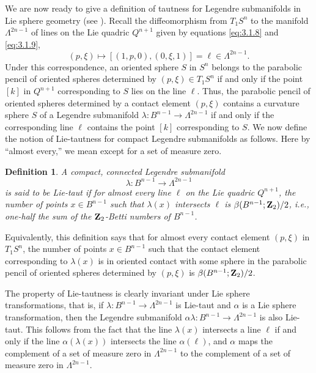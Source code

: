 \documentclass[12pt]{article}
\newtheorem{definition}{Definition}[section]
\begin{document}
We are now ready to give a definition of tautness for Legendre submanifolds in Lie sphere geometry
(see  \cite[pp. 89--92]{Cec1}).  Recall the
diffeomorphism from $T_1S^n$ to the manifold $\Lambda^{2n-1}$ of lines
on the Lie 
quadric $Q^{n+1}$ given by
equations \eqref{eq:3.1.8} and \eqref{eq:3.1.9},
\begin{equation}
\label{eq:3.6.49}
(p,\xi) \mapsto [(1,p,0),(0,\xi,1)] = \ell \in \Lambda^{2n-1}.
\end{equation}
Under this correspondence, an oriented sphere $S$ in $S^n$ belongs to the 
parabolic pencil of oriented
spheres determined by $(p,\xi) \in T_1S^n$ if and only if the point $[k]$ in $Q^{n+1}$ corresponding to $S$
lies on the line $\ell$. Thus, the parabolic pencil of oriented spheres determined by a 
contact element $(p,\xi)$ contains a
curvature sphere
$S$ of a Legendre submanifold $\lambda: B^{n-1} \rightarrow \Lambda^{2n-1}$ if and only if
the corresponding line $\ell$ contains the point $[k]$ corresponding to $S$.  We now define the notion of Lie-tautness
for compact Legendre submanifolds as follows.  Here by ``almost every,'' we mean except for a set of measure zero.

\begin{definition}
\label{def:3.6.6} 
{\rm A compact, connected Legendre submanifold 
\begin{displaymath}
\lambda: B^{n-1} \rightarrow \Lambda^{2n-1}
\end{displaymath}
is said to be
{\em Lie-taut} if for almost every line $\ell$ on the Lie quadric $Q^{n+1}$, the number of points
$x \in B^{n-1}$ such that $\lambda(x)$ intersects $\ell$ is $\beta(B^{n-1};{\bf Z}_2)/2$, i.e., one-half
the sum of the ${\bf Z}_2$-Betti numbers of $B^{n-1}$.}
\end{definition}

Equivalently, this definition says that for almost every contact element $(p,\xi)$ in $T_1S^n$, the number of points
$x \in B^{n-1}$ such that the contact element corresponding to $\lambda(x)$ is in oriented contact with some sphere
in the parabolic pencil of oriented spheres determined by $(p,\xi)$ is $\beta(B^{n-1};{\bf Z}_2)/2$.

The property of Lie-tautness is clearly invariant under Lie sphere transformations, that is, if 
$\lambda: B^{n-1} \rightarrow \Lambda^{2n-1}$ is Lie-taut and $\alpha$ is a Lie sphere transformation, then
the Legendre submanifold $\alpha \lambda: B^{n-1} \rightarrow \Lambda^{2n-1}$ is also Lie-taut.  This follows
from the fact that the line $\lambda (x)$ intersects a line $\ell$ if and only if the line 
$\alpha (\lambda (x))$ intersects the line $\alpha (\ell)$, and $\alpha$ maps the complement of a set of measure zero 
in $\Lambda^{2n-1}$ to 
the complement of a set of measure zero in $\Lambda^{2n-1}$.
\end{document}

